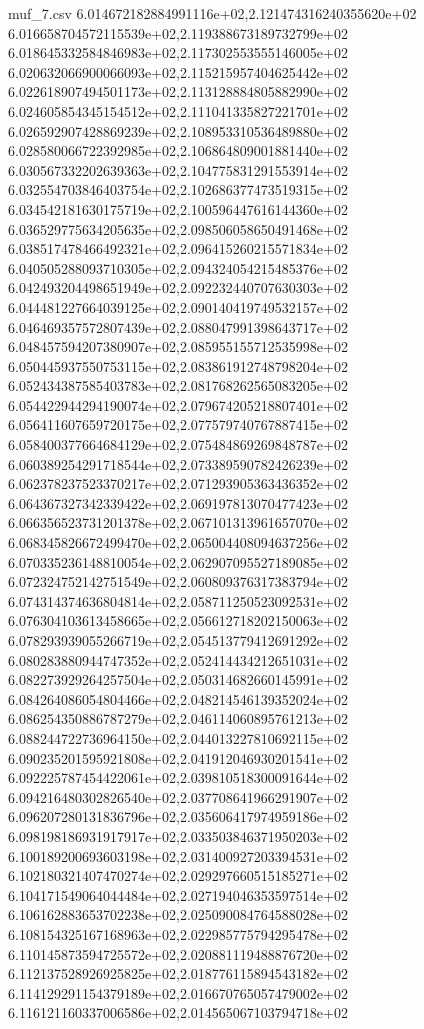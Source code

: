 \begin{filecontents*}{muf_7.csv}
6.014672182884991116e+02,2.121474316240355620e+02
6.016658704572115539e+02,2.119388673189732799e+02
6.018645332584846983e+02,2.117302553555146005e+02
6.020632066900066093e+02,2.115215957404625442e+02
6.022618907494501173e+02,2.113128884805882990e+02
6.024605854345154512e+02,2.111041335827221701e+02
6.026592907428869239e+02,2.108953310536489880e+02
6.028580066722392985e+02,2.106864809001881440e+02
6.030567332202639363e+02,2.104775831291553914e+02
6.032554703846403754e+02,2.102686377473519315e+02
6.034542181630175719e+02,2.100596447616144360e+02
6.036529775634205635e+02,2.098506058650491468e+02
6.038517478466492321e+02,2.096415260215571834e+02
6.040505288093710305e+02,2.094324054215485376e+02
6.042493204498651949e+02,2.092232440707630303e+02
6.044481227664039125e+02,2.090140419749532157e+02
6.046469357572807439e+02,2.088047991398643717e+02
6.048457594207380907e+02,2.085955155712535998e+02
6.050445937550753115e+02,2.083861912748798204e+02
6.052434387585403783e+02,2.081768262565083205e+02
6.054422944294190074e+02,2.079674205218807401e+02
6.056411607659720175e+02,2.077579740767887415e+02
6.058400377664684129e+02,2.075484869269848787e+02
6.060389254291718544e+02,2.073389590782426239e+02
6.062378237523370217e+02,2.071293905363436352e+02
6.064367327342339422e+02,2.069197813070477423e+02
6.066356523731201378e+02,2.067101313961657070e+02
6.068345826672499470e+02,2.065004408094637256e+02
6.070335236148810054e+02,2.062907095527189085e+02
6.072324752142751549e+02,2.060809376317383794e+02
6.074314374636804814e+02,2.058711250523092531e+02
6.076304103613458665e+02,2.056612718202150063e+02
6.078293939055266719e+02,2.054513779412691292e+02
6.080283880944747352e+02,2.052414434212651031e+02
6.082273929264257504e+02,2.050314682660145991e+02
6.084264086054804466e+02,2.048214546139352024e+02
6.086254350886787279e+02,2.046114060895761213e+02
6.088244722736964150e+02,2.044013227810692115e+02
6.090235201595921808e+02,2.041912046930201541e+02
6.092225787454422061e+02,2.039810518300091644e+02
6.094216480302826540e+02,2.037708641966291907e+02
6.096207280131836796e+02,2.035606417974959186e+02
6.098198186931917917e+02,2.033503846371950203e+02
6.100189200693603198e+02,2.031400927203394531e+02
6.102180321407470274e+02,2.029297660515185271e+02
6.104171549064044484e+02,2.027194046353597514e+02
6.106162883653702238e+02,2.025090084764588028e+02
6.108154325167168963e+02,2.022985775794295478e+02
6.110145873594725572e+02,2.020881119488876720e+02
6.112137528926925825e+02,2.018776115894543182e+02
6.114129291154379189e+02,2.016670765057479002e+02
6.116121160337006586e+02,2.014565067103794718e+02

\end{filecontents*}
